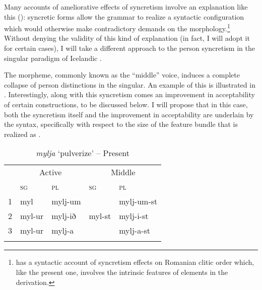 \documentclass[output=paper]{langscibook}
\begin{document}
Many accounts of ameliorative effects of syncretism involve an explanation like this (\citealt{pullum1986phonological,bejar1999multiple,Kratzer:2009jq,Ussery:2009jd,Bjorkman2016}): syncretic forms allow the grammar to realize a syntactic configuration which would otherwise make contradictory demands on the morphology.\footnote{\citet{Savescu:2009al} has a syntactic account of syncretism effects on Romanian clitic order which, like the present one,  involves the intrinsic features of elements in the derivation.}
Without denying the validity of this kind of explanation (in fact, I will adopt it for certain cases), I will take a different approach to the person syncretism in the singular paradigm of Icelandic \stvsn.

The \sti morpheme, commonly known as the “middle” voice, induces a complete collapse of person distinctions in the singular. An example of this is illustrated in . Interestingly, along with this syncretism comes an improvement in acceptability of certain \datnom constructions, to be discussed below. I will propose that in this case, both the syncretism itself and the improvement in acceptability are underlain by the syntax, specifically with respect to the size of the feature bundle that is realized as \stin. %

\begin{table}
 \caption{\label{woodxes}\textit{mylja} `pulverize' -- Present}
    \begin{tabular}{*5{l}} 
    \lsptoprule
         & \multicolumn{2}{c}{Active} & \multicolumn{2}{c}{Middle} \\\cmidrule(lr){2-3}\cmidrule(lr){4-5}
          & \textsc{sg} & \textsc{pl}  & \textsc{sg} & \textsc{pl} \\\midrule
        1 & myl & mylj-um    &         &  mylj-um-st \\
        2 & myl-ur & mylj-ið & myl-st &  mylj-i-st  \\
        3 & myl-ur  & mylj-a &        & mylj-a-st  \\
    \lspbottomrule
    \end{tabular}
\end{table} 
\end{document}
